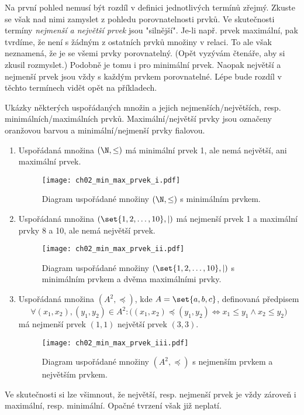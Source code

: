 Na první pohled nemusí být rozdíl v definici jednotlivých termínů zřejmý. Zkuste se však nad nimi zamyslet z pohledu porovnatelnosti prvků. Ve skutečnosti termíny \emph{nejmenší a největší prvek} jsou "silnější". Je-li např. prvek maximální, pak tvrdíme, že není s žádným z ostatních prvků množiny v relaci. To ale však neznamená, že je se všemi prvky porovnatelný. (Opět vyzývám čtenáře, aby si zkusil rozmyslet.) Podobně je tomu i pro minimální prvek. Naopak největší a nejmenší prvek jsou vždy s každým prvkem porovnatelné. Lépe bude rozdíl v těchto termínech vidět opět na příkladech.
\begin{example}\label{ex:min_max_prvek}
    \sloppy Ukázky některých uspořádaných množin a jejich nejmenších/největších, resp. minimálních/maximálních prvků. Maximální/největší prvky jsou označeny oranžovou barvou a minimální/nejmenší prvky fialovou. 
    \begin{enumerate}[label=(\roman*)]
        \item\label{item:min_max_prvek_i} Uspořádaná množina $(\N,\leq)$ má minimální prvek 1, ale nemá největší, ani maximální prvek.
        \begin{figure}[H]
            \centering
            \texttt{[image: ch02\_min\_max\_prvek\_i.pdf]}
            \caption{Diagram uspořádané množiny $(\N,\leq)$ s minimálním prvkem.}
            \label{fig:min_max_prvek_i}
        \end{figure}
        \item\label{item:min_max_prvek_ii} Uspořádaná množina $(\set{1,2,\dots,10},\mid)$ má nejmenší prvek 1 a maximální prvky 8 a 10, ale nemá největší prvek.
        \begin{figure}[H]
            \centering
            \texttt{[image: ch02\_min\_max\_prvek\_ii.pdf]}
            \caption{Diagram uspořádané množiny $(\set{1,2,\dots,10},\mid)$ s minimálním prvkem a dvěma maximálními prvky.}
            \label{fig:min_max_prvek_ii}
        \end{figure}
        \item\label{item:min_max_prvek_iii} Uspořádaná množina $(A^2,\preceq)$, kde $A=\set{a,b,c}$, definovaná předpisem
        \begin{equation*}
            \forall (x_1,x_2),(y_1,y_2)\in A^2: \big((x_1,x_2)\preceq (y_1,y_2) \iff x_1\leq y_1 \land x_2\leq y_2\big)
        \end{equation*}
        má nejmenší prvek $(1,1)$ největší prvek $(3,3)$.
        \begin{figure}[H]
            \centering
            \texttt{[image: ch02\_min\_max\_prvek\_iii.pdf]}
            \caption{Diagram uspořádané množiny $(A^2,\preceq)$ s nejmenším prvkem a největším prvkem.}
            \label{fig:min_max_prvek_iii}
        \end{figure}
    \end{enumerate}
\end{example}
Ve skutečnosti si lze všimnout, že největší, resp. nejmenší prvek je vždy zároveň i maximální, resp. minimální. Opačné tvrzení však již neplatí.